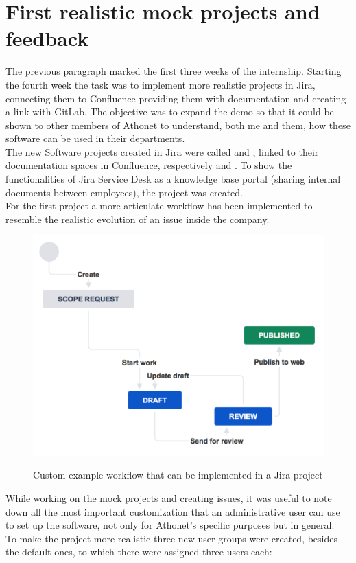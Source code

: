 \section{First realistic mock projects and feedback}

	The previous paragraph marked the first three weeks of the internship.
	Starting the fourth week the task was to implement more realistic projects in Jira, connecting them to Confluence providing them with documentation and creating a link with GitLab.
	The objective was to expand the demo so that it could be shown to other members of Athonet to understand, both me and them, how these software can be used in their departments.\\
	The new Software projects created in Jira were called  and , linked to their documentation spaces in Confluence, respectively  and .
	To show the functionalities of Jira Service Desk as a knowledge base portal (sharing internal documents between employees), the  project was created.\\
	For the first project a more articulate workflow has been implemented to resemble the realistic evolution of an issue inside the company.
	\begin{figure}[H]
		\centering
		\includegraphics[width=.7\textwidth]{resources/Web+update+workflow}\\
		\caption{Custom example workflow that can be implemented in a Jira project}
	\end{figure}
	While working on the mock projects and creating issues, it was useful to note down all the most important customization that an administrative user can use to set up the software, not only for Athonet's specific purposes but in general.\\		
	To make the project more realistic three new user groups were created, besides the default ones, to which there were assigned three users each:
